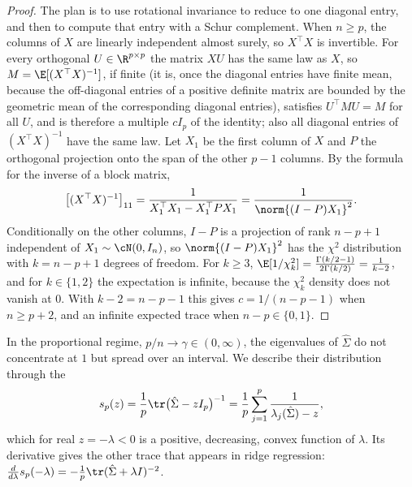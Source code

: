 \begin{refsection}
\begin{proof}
The plan is to use rotational invariance to reduce to one diagonal entry, and then to compute that entry with a Schur complement. When $n\ge p$, the columns of $X$ are linearly independent almost surely, so $X^\top X$ is invertible. For every orthogonal $U\in\R^{p\times p}$ the matrix $XU$ has the same law as $X$, so $M=\E[(X^\top X)^{-1}]$, if finite (it is, once the diagonal entries have finite mean, because the off-diagonal entries of a positive definite matrix are bounded by the geometric mean of the corresponding diagonal entries), satisfies $U^\top MU=M$ for all $U$, and is therefore a multiple $cI_p$ of the identity; also all diagonal entries of $(X^\top X)^{-1}$ have the same law. Let $X_1$ be the first column of $X$ and $P$ the orthogonal projection onto the span of the other $p-1$ columns. By the formula for the inverse of a block matrix,
\[
  \big[(X^\top X)^{-1}\big]_{11}=\frac{1}{X_1^\top X_1-X_1^\top P X_1}=\frac1{\norm{(I-P)X_1}^2}.
\]
Conditionally on the other columns, $I-P$ is a projection of rank $n-p+1$ independent of $X_1\sim\cN(0,I_n)$, so $\norm{(I-P)X_1}^2$ has the $\chi^2$ distribution with $k=n-p+1$ degrees of freedom. For $k\ge3$, $\E[1/\chi^2_k]=\frac{\Gamma(k/2-1)}{2\Gamma(k/2)}=\frac1{k-2}$, and for $k\in\{1,2\}$ the expectation is infinite, because the $\chi^2_k$ density does not vanish at $0$. With $k-2=n-p-1$ this gives $c=1/(n-p-1)$ when $n\ge p+2$, and an infinite expected trace when $n-p\in\{0,1\}$.
\end{proof}

In the proportional regime, $p/n\to\gamma\in(0,\infty)$, the eigenvalues of $\hat\Sigma$ do not concentrate at $1$ but spread over an interval. We describe their distribution through the 
\[
  s_p(z)=\frac1p\tr\big(\hat\Sigma-zI_p\big)^{-1}=\frac1p\sum_{j=1}^p\frac1{\lambda_j(\hat\Sigma)-z},
\]
which for real $z=-\lambda<0$ is a positive, decreasing, convex function of $\lambda$. Its derivative gives the other trace that appears in ridge regression: $\frac{d}{d\lambda}s_p(-\lambda)=-\frac1p\tr(\hat\Sigma+\lambda I)^{-2}$.


\end{refsection}
